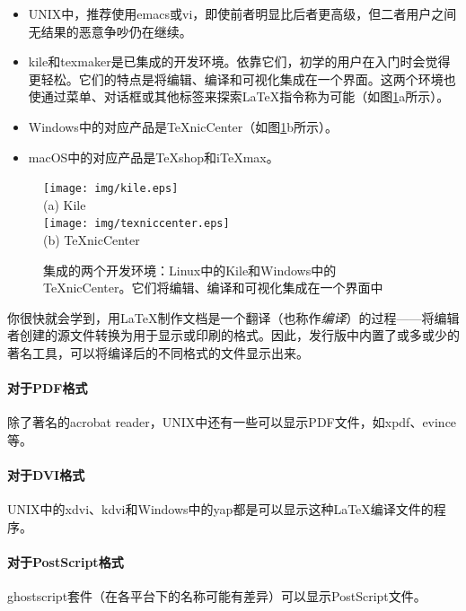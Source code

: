 \begin{itemize}
    \item UNIX中，推荐使用\textsf{emacs}或\textsf{vi}，即使前者明显比后者更高级，但二者用户之间无结果的恶意争吵仍在继续。
    \item \textsf{kile}和\textsf{texmaker}是已集成的开发环境。依靠它们，初学的用户在入门时会觉得更轻松。它们的特点是将编辑、编译和可视化集成在一个界面。这两个环境也使通过菜单、对话框或其他标签来探索\LaTeX 指令称为可能（如图\ref{fig:1.1}a所示）。
    \item Windows中的对应产品是\textsf{\TeX nicCenter}（如图\ref{fig:1.1}b所示）。
    \item macOS中的对应产品是\textsf{\TeX shop}和\textsf{i\TeX max}。
\end{itemize}

\begin{figure}%
    \centering
    \texttt{[image: img/kile.eps]}\\
    (a) Kile\\
    \texttt{[image: img/texniccenter.eps]}\\
    (b) \TeX nicCenter
    \caption{集成的两个开发环境：Linux中的Kile和Windows中的\TeX nicCenter。它们将编辑、编译和可视化集成在一个界面中}
    \label{fig:1.1}
\end{figure}

你很快就会学到，用\LaTeX 制作文档是一个翻译（也称作\textit{编译}）的过程——将编辑者创建的源文件转换为用于显示或印刷的格式。因此，发行版中内置了或多或少的著名工具，可以将编译后的不同格式的文件显示出来。

\paragraph*{对于PDF格式}除了著名的\textsf{acrobat reader}，UNIX中还有一些可以显示PDF文件，如\textsf{xpdf}、\textsf{evince}等。

\paragraph*{对于DVI格式}UNIX中的\textsf{xdvi}、\textsf{kdvi}和Windows中的\textsf{yap}都是可以显示这种\LaTeX 编译文件的程序。

\paragraph*{对于PostScript格式}\textsf{ghostscript}套件（在各平台下的名称可能有差异）可以显示PostScript文件。

